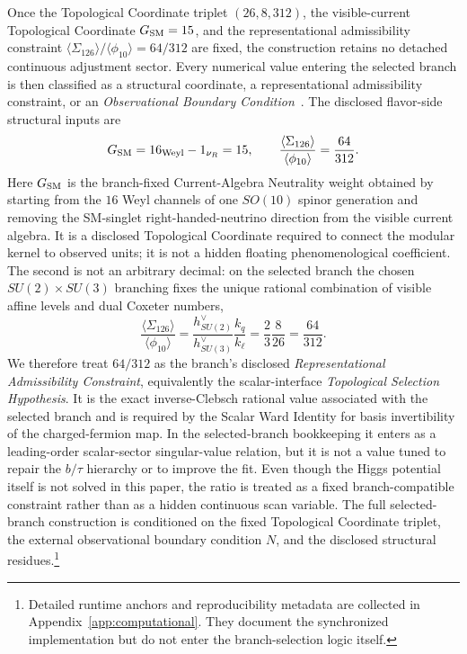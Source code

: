 \documentclass[11pt]{article}
\begin{document}
Once the Topological Coordinate triplet $(26,8,312)$, the visible-current Topological Coordinate $G_{\rm SM}=15$, and the representational admissibility constraint $\langle \Sigma_{126}\rangle/\langle\phi_{10}\rangle=64/312$ are fixed, the construction retains no detached continuous adjustment sector. Every numerical value entering the selected branch is then classified as a structural coordinate, a representational admissibility constraint, or an \emph{Observational Boundary Condition}~\cite{friedan1987,witten1989}. The disclosed flavor-side structural inputs are
\begin{equation}
 G_{\rm SM}=16_{\rm Weyl}-1_{\nu_R}=15,
 \qquad
 \frac{\langle \Sigma_{126}\rangle}{\langle\phi_{10}\rangle}=\frac{64}{312}.
\end{equation}
Here $G_{\rm SM}$ is the branch-fixed Current-Algebra Neutrality weight obtained by starting from the $16$ Weyl channels of one $SO(10)$ spinor generation and removing the SM-singlet right-handed-neutrino direction from the visible current algebra. It is a disclosed Topological Coordinate required to connect the modular kernel to observed units; it is not a hidden floating phenomenological coefficient. The second is not an arbitrary decimal: on the selected branch the chosen $SU(2)\times SU(3)$ branching fixes the unique rational combination of visible affine levels and dual Coxeter numbers,
\begin{equation}
 \frac{\langle \Sigma_{126}\rangle}{\langle\phi_{10}\rangle}
 =
 \frac{h^{\vee}_{SU(2)}}{h^{\vee}_{SU(3)}}\frac{k_q}{k_{\ell}}
 =
 \frac{2}{3}\frac{8}{26}
 =
 \frac{64}{312}.
\end{equation}
We therefore treat $64/312$ as the branch's disclosed \emph{Representational Admissibility Constraint}, equivalently the scalar-interface \emph{Topological Selection Hypothesis}. It is the exact inverse-Clebsch rational value associated with the selected branch and is required by the Scalar Ward Identity for basis invertibility of the charged-fermion map. In the selected-branch bookkeeping it enters as a leading-order scalar-sector singular-value relation, but it is not a value tuned to repair the $b/\tau$ hierarchy or to improve the fit. Even though the Higgs potential itself is not solved in this paper, the ratio is treated as a fixed branch-compatible constraint rather than as a hidden continuous scan variable. The full selected-branch construction is conditioned on the fixed Topological Coordinate triplet, the external observational boundary condition $N$, and the disclosed structural residues.\footnote{Detailed runtime anchors and reproducibility metadata are collected in Appendix~\ref{app:computational}. They document the synchronized implementation but do not enter the branch-selection logic itself.}
\end{document}
